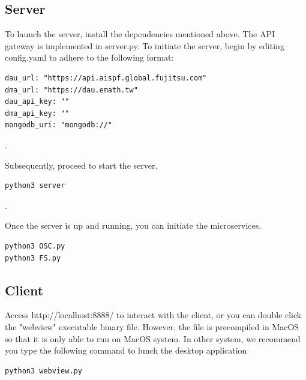 \documentclass[11pt, oneside]{article}   	%
\begin{document}
\subsection{Server}
To launch the server, install the dependencies mentioned above. The API gateway is implemented in server.py. To initiate the server, begin by editing config.yaml to adhere to the following format:
\begin{verbatim}
dau_url: "https://api.aispf.global.fujitsu.com"
dma_url: "https://dau.emath.tw"
dau_api_key: ""
dma_api_key: ""
mongodb_uri: "mongodb://"
\end{verbatim}.

Subsequently, proceed to start the server.
\begin{verbatim}
python3 server
\end{verbatim}.

Once the server is up and running, you can initiate the microservices.
\begin{verbatim}
python3 OSC.py
python3 FS.py
\end{verbatim}

\subsection{Client}
Access http://localhost:8888/ to interact with the client, or you can double click the "webview" executable binary file. However, the file is precompiled in MacOS so that it is only able to run on MacOS system. In other system, we recommend you type the following command to lunch the desktop application

\begin{verbatim}
python3 webview.py
\end{verbatim}
\end{document}

